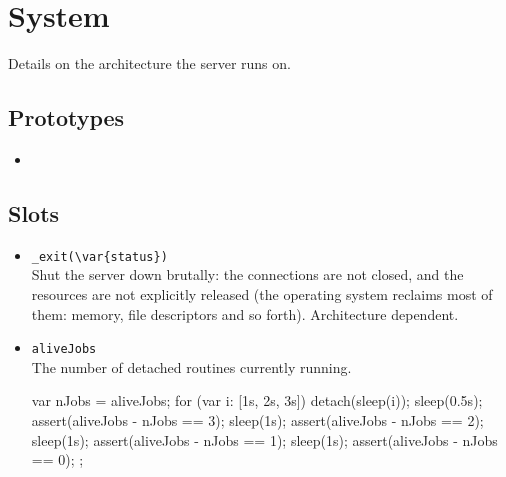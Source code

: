 \section{System}
Details on the architecture the \urbi server runs on.

\subsection{Prototypes}
\begin{itemize}
\item {}
\end{itemize}

\subsection{Slots}
\begin{itemize}

\item \lstinline|_exit(\var{status})|\\
  Shut the server down brutally: the connections are not closed, and
  the resources are not explicitly released (the operating system
  reclaims most of them: memory, file descriptors and so forth).
  Architecture dependent.

\item \lstinline|aliveJobs|\\
  The number of detached routines currently running.
\begin{urbiscript}[firstnumber=last]
{
  var nJobs = aliveJobs;
  for (var i: [1s, 2s, 3s])
    detach({sleep(i)});
  sleep(0.5s);
  assert(aliveJobs - nJobs == 3);
  sleep(1s);
  assert(aliveJobs - nJobs == 2);
  sleep(1s);
  assert(aliveJobs - nJobs == 1);
  sleep(1s);
  assert(aliveJobs - nJobs == 0);
};
\end{urbiscript}


\end{itemize}
